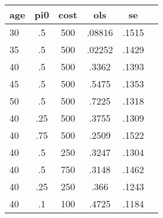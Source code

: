\begin{table}[htbp]
\begin{tabular}{lccccc} \hline \hline
 \multicolumn{1}{c}{ age }  & pi0  & cost  & ols  & se  \\  \hline 
       30 &        .5 &       500 &    .08816 &     .1515 \\  
       35 &        .5 &       500 &    .02252 &     .1429 \\  
       40 &        .5 &       500 &     .3362 &     .1393 \\  
       45 &        .5 &       500 &     .5475 &     .1353 \\  
       50 &        .5 &       500 &     .7225 &     .1318 \\  
       40 &       .25 &       500 &     .3755 &     .1309 \\  
       40 &       .75 &       500 &     .2509 &     .1522 \\  
       40 &        .5 &       250 &     .3247 &     .1304 \\  
       40 &        .5 &       750 &     .3148 &     .1462 \\  
       40 &       .25 &       250 &      .366 &     .1243 \\  
       40 &        .1 &       100 &     .4725 &     .1184 \\  
\hline \hline \end{tabular}
\end{table}
